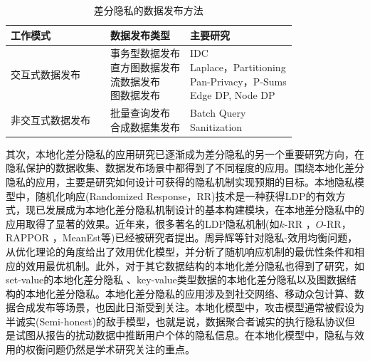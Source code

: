\begin{table}[htbp]
\caption{差分隐私的数据发布方法}
\label{tab:survey_dp_publishing}
\centering
\fontsize{10pt}{\baselineskip}\selectfont
\begin{tabular}{p{}p{}p{}p{}}
\toprule
	\textbf{工作模式}& &\textbf{数据发布类型}&\textbf{主要研究}\\
	\midrule
   交互式数据发布& &\makecell[l]{事务型数据发布 \\ 直方图数据发布 \\ 流数据发布\\ 图数据发布} &\makecell[l]{
IDC\cite{gupta2012iterative}\\Laplace\cite{dwork2006calibrating}，Partitioning\cite{chen2011publishing}\\ Pan-Privacy\cite{dwork2010differential}，P-Sums\cite{chan2011private}\\ Edge DP\cite{zhang2015private}, Node DP\cite{kasiviswanathan2013analyzing}} \\
   \midrule
非交互式数据发布& &\makecell[l]{批量查询发布\\ 合成数据集发布} & \makecell[l]{Batch Query\cite{yuan2012low}\\ Sanitization\cite{dwork2009on}}\\

  \bottomrule
\end{tabular}
\end{table}

其次，本地化差分隐私的应用研究\cite{yeqingqing2018}已逐渐成为差分隐私的另一个重要研究方向，在隐私保护的数据收集、数据发布场景中都得到了不同程度的应用。围绕本地化差分隐私的应用，主要是研究如何设计可获得的隐私机制实现预期的目标。本地隐私模型中，随机化响应(Randomized Response，RR)\cite{warner1965randomized}技术是一种获得LDP的有效方式，现已发展成为本地化差分隐私机制设计的基本构建模块，在本地差分隐私中的应用取得了显著的效果。近年来，很多著名的LDP隐私机制(如$k$-RR \cite{kairouz2016extremal}，$O$-RR\cite{kairouz2016discrete}，RAPPOR \cite{erlingsson2014rappor,fanti2016building}，MeanEst\cite{duchi2013localprivacy}等)已经被研究者提出。周异辉等\cite{zhouyihui2019}针对隐私-效用均衡问题，从优化理论的角度给出了效用优化模型，并分析了随机响应机制的最优性条件和相应的效用最优机制。此外，对于其它数据结构的本地化差分隐私也得到了研究，如set-value的本地化差分隐私
\cite{wang2018privset,qin2016heavy}、key-value类型数据的本地化差分隐私\cite{ye2019privkv}以及图数据结构的本地化差分隐私\cite{wei2020asgldp}。本地化差分隐私的应用涉及到社交网络\cite{qin2017generating}、移动众包计算\cite{sei2017differential}、数据合成发布\cite{ren2018textsf,yang2017copula}等场景，也因此日渐受到关注。本地化模型中，攻击模型通常被假设为半诚实(Semi-honest)的敌手模型，也就是说，数据聚合者诚实的执行隐私协议但是试图从报告的扰动数据中推断用户个体的隐私信息\cite{sei2017differential}。在本地化模型中，隐私与效用的权衡问题仍然是学术研究关注的重点。

